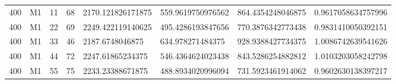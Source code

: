 \begin{table}[t]
\begin{tabular}{llllllll}
400 & M1 & 11 & 68 & 2170.121826171875 & 559.9619750976562 & 864.4354248046875 & 0.9617058634757996 \\
400 & M1 & 22 & 69 & 2249.422119140625 & 495.4286193847656 & 770.3876342773438 & 0.9831410050392151 \\
400 & M1 & 33 & 46 & 2187.6748046875 & 634.978271484375 & 928.9388427734375 & 1.0086742639541626 \\
400 & M1 & 44 & 72 & 2247.61865234375 & 546.4364624023438 & 843.5286254882812 & 1.0103203058242798 \\
400 & M1 & 55 & 75 & 2233.23388671875 & 488.8934020996094 & 731.5923461914062 & 0.9602630138397217 \\
\hline
\end{tabular}
\end{table}
